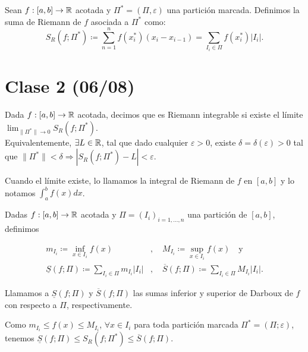 \documentclass[a4paper]{report}
\begin{document}
	\begin{definition}
		Sean $f:[a,b]\to\mathbb{R}$ acotada y $\Pi^*=(\Pi,\varepsilon)$ una partición marcada. Definimos la suma de Riemann de $f$ asociada a $\Pi^*$ como:
		\[
		S_R(f;\Pi^*)\coloneqq \sum_{n=1}^{n} f(x_i^*)(x_i-x_{i-1})= \sum_{I_i\in\Pi}^{} f(x_i^*)|I_i|.
		\]
	\end{definition}

	\section{Clase 2 (06/08)}

	\begin{definition}
		Dada $f:[a,b]\to\mathbb{R}$ acotada, decimos que es Riemann integrable si existe el límite $\lim_{\|\Pi^*\|\to 0} S_R(f;\Pi^*)$. \\
		Equivalentemente, $\exists L\in\mathbb{R}$, tal que dado cualquier $\varepsilon>0$, existe $\delta=\delta(\varepsilon)>0$ tal que $\|\Pi^*\|<\delta\Rightarrow|S_R(f;\Pi^*)-L|<\varepsilon$.
	\end{definition}

	\begin{remark}
		Cuando el límite existe, lo llamamos la integral de Riemann de $f$ en $[a,b]$ y lo notamos $\int_{a}^{b} f(x) dx$.
	\end{remark}

	\begin{definition}
		Dadas $f:[a,b]\to\mathbb{R}$ acotada y $\Pi=(I_i)_{i=1,\dots,n}$ una partición de $[a,b]$, definimos 
	
		\begin{align*}
			m_{I_i}\coloneqq\inf_{x\in I_i} f(x) &,\quad M_{I_i}\coloneqq\sup_{x\in I_i} f(x) \quad \text{y} \\
			\underline{S}(f;\Pi)\coloneqq\sum_{I_i\in\Pi}^{} m_{I_i}|I_i|&,\quad \overline{S}(f;\Pi)\coloneqq\sum_{I_i\in\Pi}^{} M_{I_i}|I_i|
		.\end{align*}

		Llamamos a $\underline{S}(f;\Pi)$ y $\overline{S}(f;\Pi)$ las sumas inferior y superior de Darboux de $f$ con respecto a $\Pi$, respectivamente.
	\end{definition}

	\begin{note}
		Como $m_{I_i}\leq f(x)\leq M_{I_i}$, $\forall x\in I_i$ para toda partición marcada $\Pi^*=(\Pi;\varepsilon)$, tenemos $\underline{S}(f;\Pi)\leq S_R(f;\Pi^*)\leq \overline{S}(f;\Pi)$.
	\end{note}
\end{document}
